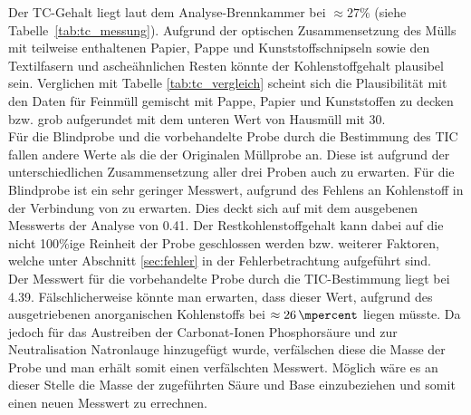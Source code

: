 Der TC-Gehalt liegt laut dem Analyse-Brennkammer bei $\approx 27\%$ (siehe \mbox{Tabelle \ref{tab:tc_messung}}). Aufgrund der optischen Zusammensetzung des Mülls mit teilweise enthaltenen Papier, Pappe und Kunststoffschnipseln sowie den Textilfasern und ascheähnlichen Resten könnte der Kohlenstoffgehalt plausibel sein. Verglichen mit Tabelle \ref{tab:tc_vergleich} \mbox{\cite[S.11]{HansGunterRamke.}} scheint sich die Plausibilität mit den Daten für Feinmüll gemischt mit Pappe, Papier und Kunststoffen zu decken bzw. grob aufgerundet mit dem unteren Wert von Hausmüll mit \SI{30}{\mpercent}.\\
Für die Blindprobe und die vorbehandelte Probe durch die Bestimmung des TIC fallen andere Werte als die der Originalen Müllprobe an. Diese ist aufgrund der unterschiedlichen Zusammensetzung aller drei Proben auch zu erwarten. Für die Blindprobe ist ein sehr geringer Messwert, aufgrund des Fehlens an Kohlenstoff in der Verbindung von  zu erwarten. Dies deckt sich auf mit dem ausgebenen Messwerts der Analyse von \SI{0,41}{\mpercent}. Der Restkohlenstoffgehalt kann dabei auf die nicht 100\%ige Reinheit der Probe geschlossen werden bzw. weiterer Faktoren, welche unter Abschnitt \ref{sec:fehler} in der Fehlerbetrachtung aufgeführt sind.\\
Der Messwert für die vorbehandelte Probe durch die TIC-Bestimmung liegt bei \SI{4,39}{\mpercent}. Fälschlicherweise könnte man erwarten, dass dieser Wert, aufgrund des ausgetriebenen anorganischen Kohlenstoffs bei $\approx \SI{26}{\mpercent}$ liegen müsste. Da jedoch für das Austreiben der Carbonat-Ionen Phosphorsäure und zur Neutralisation Natronlauge hinzugefügt wurde, verfälschen diese die Masse der Probe und man erhält somit einen verfälschten Messwert. Möglich wäre es an dieser Stelle die Masse der zugeführten Säure und Base einzubeziehen und somit einen neuen Messwert zu errechnen.
\vspace*{-3.5mm}
\renewcommand{\arraystretch}{1.2}
\begin{table}[h!]
	\centering
	\caption[Elementgehalte von Restabfall und ausgewählter Fraktionen]{Elementgehalte von Restabfall und ausgewählter Fraktionen \cite[S.11]{HansGunterRamke.}}
	\label{tab:tc_vergleich}
\end{table}
